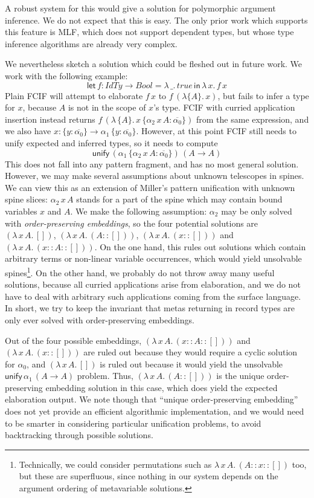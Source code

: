\documentclass[acmsmall,review,anonymous,prologue,dvipsnames]{acmart}\settopmatter{printfolios=true,printccs=false,printacmref=false}
\newcommand{\slet}{\boldsymbol{\mathsf{let}}}
\renewcommand{\sin}{\boldsymbol{\mathsf{in}}}
\newcommand{\unify}{\mathsf{unify}}
\newcommand{\mi}[1]{\mathit{#1}}
\newcommand{\ol}[1]{\overline{#1}}
\theoremstyle{remark}
\begin{document}
A robust system for this would give a solution for polymorphic argument
inference. We do not expect that this is easy. The only prior work which
supports this feature is MLF, which does not support dependent types, but whose
type inference algorithms are already very complex.

We nevertheless sketch a solution which could be fleshed out in future work. We
work with the following example:
\[
  \slet\,f : \mi{IdTy} \to \mi{Bool} = \lambda\,\_.\,\mi{true}\,\sin\,\lambda\,x.\,f\,x
\]
Plain FCIF will attempt to elaborate $f\,x$ to $f\,(\lambda\{A\}.\,x)$, but
fails to infer a type for $x$, because $A$ is not in the scope of $x$'s type.
FCIF with curried application insertion instead returns
$f\,(\lambda\,\{A\}.\,x\,\{\alpha_2\,x\,A : \ol{\alpha_0}\})$ from the same
expression, and we also have $x : \{y : \ol{\alpha_0}\}\to \alpha_1\,\{y :
\ol{\alpha_0}\}$. However, at this point FCIF still needs to unify expected and
inferred types, so it needs to compute
\[
\unify\,(\alpha_1\,\{\alpha_2\,x\,A : \ol{\alpha_0}\})\,(A \to A)
\]
This does not fall into any pattern fragment, and has no most general solution.
However, we may make several assumptions about unknown telescopes in spines. We
can view this as an extension of Miller's pattern unification
\cite{millerpattern} with unknown spine slices: $\alpha_2\,x\,A$ stands for a
part of the spine which may contain bound variables $x$ and $A$. We make the
following assumption: $\alpha_2$ may be only solved with \emph{order-preserving
  embeddings}, so the four potential solutions are $(\lambda\,x\,A.\,[])$,
$(\lambda\,x\,A.\,(A :: []))$, $(\lambda\,x\,A.\,(x :: []))$ and
$(\lambda\,x\,A.\,(x :: A :: []))$. On the one hand, this rules out solutions which
contain arbitrary terms or non-linear variable occurrences, which would yield
unsolvable spines\footnote{Technically, we could consider
  permutations such as $\lambda\,x\,A.\,(A :: x :: [])$ too, but these are
  superfluous, since nothing in our system depends on the argument ordering of
  metavariable solutions.}. On the other hand, we probably do not throw away many useful
solutions, because all curried applications arise from elaboration, and we do
not have to deal with arbitrary such applications coming from the surface
language. In short, we try to keep the invariant that metas returning in record
types are only ever solved with order-preserving embeddings.

Out of the four possible embeddings, $(\lambda\,x\,A.\,(x :: A :: []))$ and
$(\lambda\,x\,A.\,(x :: []))$ are ruled out because they would require a cyclic
solution for $\alpha_0$, and $(\lambda\,x\,A.\,[])$ is ruled out because it
would yield the unsolvable $\unify\,\alpha_1\,(A \to A)$ problem. Thus,
$(\lambda\,x\,A.\,(A :: []))$ is the unique order-preserving embedding solution
in this case, which does yield the expected elaboration output. We note though
that ``unique order-preserving embedding'' does not yet provide an efficient
algorithmic implementation, and we would need to be smarter in considering
particular unification problems, to avoid backtracking through possible
solutions.
\end{document}
